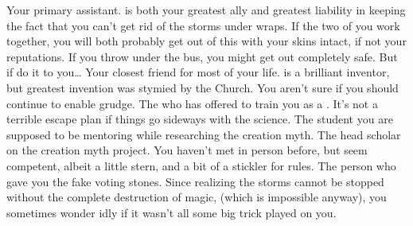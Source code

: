 \documentclass[char]{GL2020}
\begin{document}
\begin{contacts}
	\contact{\cAssistantScientist{}} Your primary assistant. \cAssistantScientist{} is both your greatest ally and greatest liability in keeping the fact that you can’t get rid of the storms under wraps. If the two of you work together, you will both probably get out of this with your skins intact, if not your reputations. If you throw \cAssistantScientist{} under the bus, you might get out completely safe. But if \cAssistantScientist{\they} do it to you\ldots
	\contact{\cChupInventor{}} Your closest friend for most of your life. \cChupInventor{} is a brilliant inventor, but \cChupInventor{\their} greatest invention was stymied by the Church. You aren’t sure if you should continue to enable \cChupInventor{\their} grudge.
	\contact{\cBeetle{}} The \cBeetle{\cleric} who has offered to train you as a \cHeadScientist{\cleric}. It’s not a terrible escape plan if things go sideways with the science.
	\contact{\cScholarship{}} The student you are supposed to be mentoring while researching the creation myth.
	\contact{\cEbbPriest{}} The head scholar on the creation myth project. You haven’t met in person before, but \cEbbPriest{\they} seem competent, albeit a little stern, and a bit of a stickler for rules.
	\contact{\cEvil{}} The person who gave you the fake voting stones. Since realizing the storms cannot be stopped without the complete destruction of magic, (which is impossible anyway), you sometimes wonder idly if it wasn’t all some big trick played on you.
\end{contacts}
\end{document}
